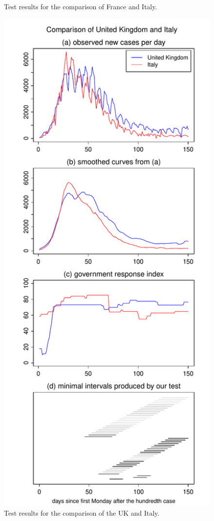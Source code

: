 \documentclass[a4paper,12pt]{article}
\numberwithin{equation}{section}
\begin{document}
\begin{figure}[h!]
\begin{minipage}[t]{0.49\textwidth}
\caption{Test results for the comparison of France and Italy.}
\end{minipage}
\hspace{0.25cm}
\begin{minipage}[t]{0.49\textwidth}
\includegraphics[width=\textwidth]{plots/GBR_vs_ITA_Monday}
\caption{Test results for the comparison of the UK and Italy.}
\end{minipage}
\end{figure}
\end{document}
